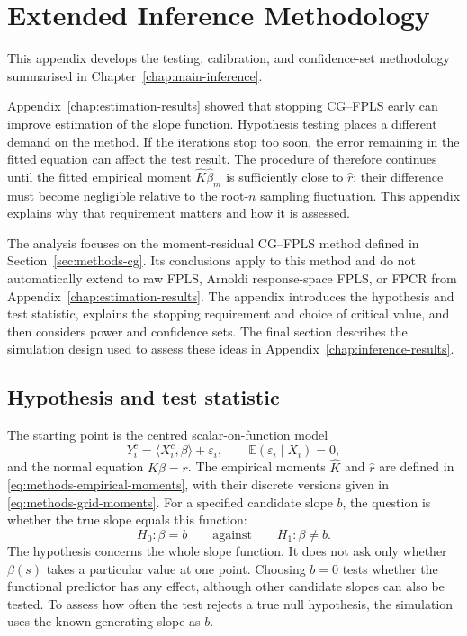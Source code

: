 \chapter{Extended Inference Methodology}
\label{chap:inference-methodology}

This appendix develops the testing, calibration, and confidence-set methodology summarised in
Chapter~\ref{chap:main-inference}.

Appendix~\ref{chap:estimation-results} showed that stopping CG--FPLS early can
improve estimation of the slope function.  Hypothesis testing places a
different demand on the method.  If the iterations stop too soon, the error
remaining in the fitted equation can affect the test result.  The procedure
of \textcite{babii_carrasco_tsafack_2026} therefore continues until the fitted
empirical moment $\widehat K\widehat\beta_m$ is sufficiently close to
$\widehat r$: their difference must become negligible relative to the
root-$n$ sampling fluctuation.  This appendix explains why that requirement
matters and how it is assessed.

The analysis focuses on the moment-residual CG--FPLS method defined in
Section~\ref{sec:methods-cg}.  Its conclusions apply to this method and do
not automatically extend to raw FPLS, Arnoldi response-space FPLS, or FPCR
from Appendix~\ref{chap:estimation-results}.  The appendix introduces the
hypothesis and test statistic, explains the stopping requirement and choice
of critical value, and then considers power and confidence sets.  The final
section describes the simulation design used to assess these ideas in
Appendix~\ref{chap:inference-results}.

\section{Hypothesis and test statistic}
\label{sec:inference-target}

The starting point is the centred scalar-on-function model
\begin{equation}
    Y_i^c=\langle X_i^c,\beta\rangle+\varepsilon_i,
    \qquad
    \mathbb E(\varepsilon_i\mid X_i)=0,
    \label{eq:inference-model}
\end{equation}
and the normal equation $K\beta=r$.  The empirical moments
$\widehat K$ and $\widehat r$ are defined in
\eqref{eq:methods-empirical-moments}, with their discrete versions given in
\eqref{eq:methods-grid-moments}.  For a specified candidate slope $b$, the
question is whether the true slope equals this function:
\begin{equation}
    H_0:\beta=b
    \qquad\text{against}\qquad
    H_1:\beta\neq b.
    \label{eq:inference-hypothesis}
\end{equation}
The hypothesis concerns the whole slope function.  It does not ask only
whether $\beta(s)$ takes a particular value at one point.  Choosing $b=0$
tests whether the functional predictor has any effect, although other
candidate slopes can also be tested.  To assess how often the test rejects
a true null hypothesis, the simulation uses the known generating slope as $b$.

